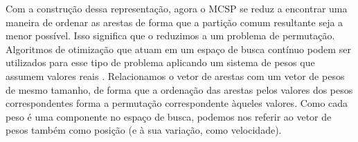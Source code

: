     Com a construção dessa representação, agora o MCSP se reduz a encontrar uma maneira de ordenar as arestas de forma que a partição comum resultante seja a menor possível. Isso significa que o reduzimos a um problema de permutação. Algoritmos de otimização que atuam em um espaço de busca contínuo podem ser utilizados para esse tipo de problema aplicando um sistema de pesos que assumem valores reais \cite[p.~661]{marti_handbook_2018}. Relacionamos o vetor de arestas com um vetor de pesos de mesmo tamanho, de forma que a ordenação das arestas pelos valores dos pesos correspondentes forma a permutação correspondente àqueles valores. Como cada peso é uma componente no espaço de busca, podemos nos referir ao vetor de pesos também como posição (e à sua variação, como velocidade).
